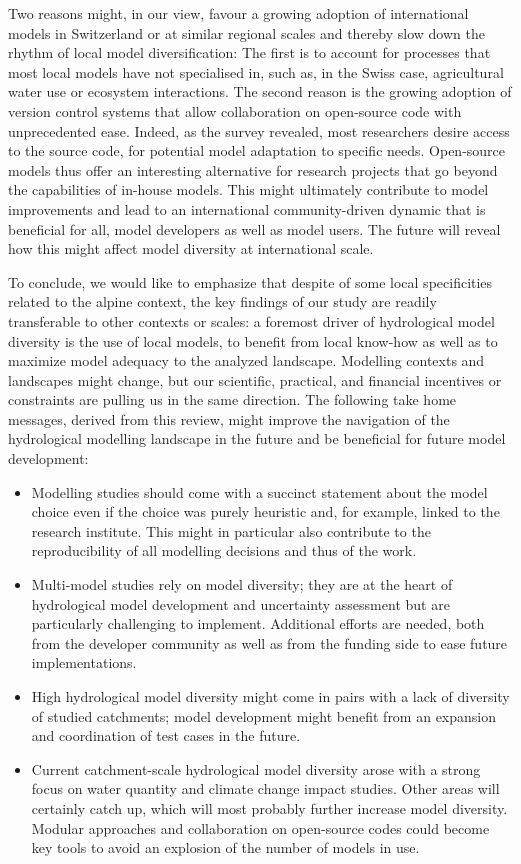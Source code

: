 \documentclass[10pt,a4paper]{article}
\begin{document}
Two reasons might, in our view, favour a growing adoption of international models in Switzerland or at similar regional scales and thereby slow down the rhythm of local model diversification: The first is to account for processes that most local models have not specialised in, such as, in the Swiss case, agricultural water use or ecosystem interactions. The second reason is the growing adoption of version control systems that allow collaboration on open-source code with unprecedented ease. Indeed, as the survey revealed, most researchers desire access to the source code, for potential model adaptation to specific needs. Open-source models thus offer an interesting alternative for research projects that go beyond the capabilities of in-house models. This might ultimately contribute to model improvements and lead to an international community-driven dynamic that is beneficial for all, model developers as well as model users. The future will reveal how this might affect model diversity at international scale.

To conclude, we would like to emphasize that despite of some local specificities related to the alpine context, the key findings of our study are readily transferable to other contexts or scales: a foremost driver of hydrological model diversity is the use of local models, to benefit from local know-how as well as to maximize model adequacy to the analyzed landscape. Modelling contexts and landscapes might change, but our scientific, practical, and financial incentives or constraints are pulling us in the same direction. The following take home messages, derived from this review, might improve the navigation of the hydrological modelling landscape in the future and be beneficial for future model development:
\begin{itemize}
    \item Modelling studies should come with a succinct statement about the model choice even if the choice was purely heuristic and, for example, linked to the research institute. This might in particular also contribute to the reproducibility of all modelling decisions and thus of the work. 
    \item Multi-model studies rely on model diversity; they are at the heart of hydrological model development and uncertainty assessment but are particularly challenging to implement. Additional efforts are needed, both from the developer community as well as from the funding side to ease future implementations.
    \item High hydrological model diversity might come in pairs with a lack of diversity of studied catchments; model development might benefit from an expansion and coordination of test cases in the future.
    \item Current catchment-scale hydrological model diversity arose with a strong focus on water quantity and climate change impact studies. Other areas will certainly catch up, which will most probably further increase model diversity. Modular approaches and collaboration on open-source codes could become key tools to avoid an explosion of the number of models in use.
\end{itemize}
\end{document}
